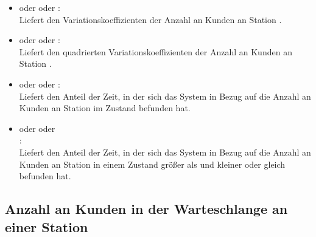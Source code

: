 \begin{itemize}
\item
{} oder  oder :\\
Liefert den Variationskoeffizienten der Anzahl an Kunden an Station .

\item
{} oder  oder :\\
Liefert den quadrierten Variationskoeffizienten der Anzahl an Kunden an Station .

\item
{} oder  oder :\\
Liefert den Anteil der Zeit, in der sich das System in Bezug auf die Anzahl an Kunden an Station  im Zustand  befunden hat.

\item
{} oder  oder\\
:\\
Liefert den Anteil der Zeit, in der sich das System in Bezug auf die Anzahl an Kunden an Station  in einem Zustand größer als  und kleiner oder gleich  befunden hat.

\end{itemize}



\subsection{Anzahl an Kunden in der Warteschlange an einer Station}


